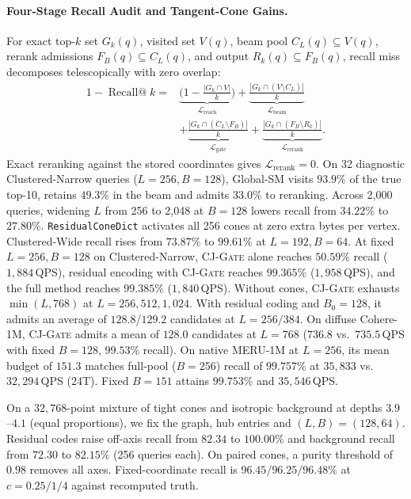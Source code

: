 \paragraph{Four-Stage Recall Audit and Tangent-Cone Gains.}
For exact top-$k$ set $G_k(q)$, visited set $V(q)$, beam pool $C_L(q) \subseteq V(q)$, rerank admissions $F_B(q) \subseteq C_L(q)$, and output $R_k(q) \subseteq F_B(q)$, recall miss decomposes telescopically with zero overlap:
\begin{equation}
  \begin{aligned}
    1-\operatorname{Recall@}k
      ={}&\underbrace{\bigl(1-\tfrac{|G_k\cap V|}{k}\bigr)}_{\mathcal L_{\mathrm{reach}}}
       +\underbrace{\tfrac{|G_k\cap(V\setminus C_L)|}{k}}_{\mathcal L_{\mathrm{beam}}}\\
       &+\underbrace{\tfrac{|G_k\cap(C_L\setminus F_B)|}{k}}_{\mathcal L_{\mathrm{gate}}}
       +\underbrace{\tfrac{|G_k\cap(F_B\setminus R_k)|}{k}}_{\mathcal L_{\mathrm{rerank}}}.
  \end{aligned}
  \label{eq:four_stage_loss}
\end{equation}
Exact reranking against the stored coordinates gives $\mathcal L_{\mathrm{rerank}}=0$. On 32 diagnostic {Clustered-Narrow} queries ($L=256,B=128$), {Global-SM} visits $93.9\%$ of the true top-10, retains $49.3\%$ in the beam and admits $33.0\%$ to reranking. Across 2,000 queries, widening $L$ from 256 to 2,048 at $B=128$ lowers recall from $34.22\%$ to $27.80\%$.
\texttt{ResidualConeDict} activates all 256 cones at zero extra bytes per vertex. {Clustered-Wide} recall rises from $73.87\%$ to $99.61\%$ at $L=192,B=64$.
At fixed $L=256,B=128$ on {Clustered-Narrow}, \textsc{CJ-Gate} alone reaches $50.59\%$ recall ($1{,}884$\,QPS), residual encoding with \textsc{CJ-Gate} reaches $99.365\%$ ($1{,}958$\,QPS), and the full method reaches $99.385\%$ ($1{,}840$\,QPS).
Without cones, \textsc{CJ-Gate} exhausts $\min(L,768)$ at $L=256,512,1{,}024$. With residual coding and $B_0=128$, it admits an average of $128.8$/$129.2$ candidates at $L=256/384$.
On diffuse {Cohere-1M}, \textsc{CJ-Gate} admits a mean of $128.0$ candidates at $L=768$ ($736.8$ vs.\ $735.5$\,QPS with fixed $B=128$, $99.53\%$ recall). On native {MERU-1M} at $L=256$, its mean budget of $151.3$ matches full-pool ($B=256$) recall of $99.757\%$ at $35{,}833$ vs.\ $32{,}294$\,QPS (24T). Fixed $B=151$ attains $99.753\%$ and $35{,}546$\,QPS.

On a $32{,}768$-point mixture of tight cones and isotropic background at depths $3.9$--$4.1$ (equal proportions), we fix the graph, hub entries and $(L,B)=(128,64)$. Residual codes raise off-axis recall from $82.34$ to $100.00\%$ and background recall from $72.30$ to $82.15\%$ (256 queries each). On paired cones, a purity threshold of $0.98$ removes all axes. Fixed-coordinate recall is $96.45/96.25/96.48\%$ at $c=0.25/1/4$ against recomputed truth.

